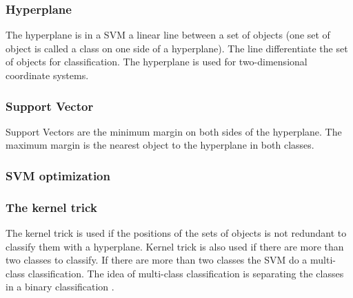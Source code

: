 \subsubsection*{Hyperplane}

The hyperplane is in a SVM a linear line between a set of objects (one set of object is called a class on one side of a hyperplane). The line differentiate the set of objects for classification. The hyperplane is used for two-dimensional coordinate systems.

\subsubsection*{Support Vector}

Support Vectors are the minimum margin on both sides of the hyperplane. The maximum margin is the nearest object to the hyperplane in both classes.

\subsubsection*{SVM optimization}

\subsubsection*{The kernel trick}

The kernel trick is used if the positions of the sets of objects is not redundant to classify them with a hyperplane. Kernel trick is also used if there are more than two classes to classify. If there
are more than two classes the SVM do a multi-class classification. The idea of multi-class classification is separating the classes in a binary classification \cite{tzotsos2008support}.
